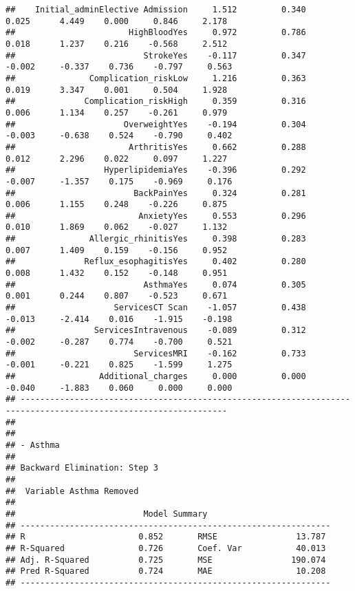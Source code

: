 \documentclass[
]{article}
\begin{document}
\begin{verbatim}
##    Initial_adminElective Admission     1.512         0.340        0.025      4.449    0.000     0.846     2.178 
##                       HighBloodYes     0.972         0.786        0.018      1.237    0.216    -0.568     2.512 
##                          StrokeYes    -0.117         0.347       -0.002     -0.337    0.736    -0.797     0.563 
##               Complication_riskLow     1.216         0.363        0.019      3.347    0.001     0.504     1.928 
##              Complication_riskHigh     0.359         0.316        0.006      1.134    0.257    -0.261     0.979 
##                      OverweightYes    -0.194         0.304       -0.003     -0.638    0.524    -0.790     0.402 
##                       ArthritisYes     0.662         0.288        0.012      2.296    0.022     0.097     1.227 
##                  HyperlipidemiaYes    -0.396         0.292       -0.007     -1.357    0.175    -0.969     0.176 
##                        BackPainYes     0.324         0.281        0.006      1.155    0.248    -0.226     0.875 
##                         AnxietyYes     0.553         0.296        0.010      1.869    0.062    -0.027     1.132 
##               Allergic_rhinitisYes     0.398         0.283        0.007      1.409    0.159    -0.156     0.952 
##              Reflux_esophagitisYes     0.402         0.280        0.008      1.432    0.152    -0.148     0.951 
##                          AsthmaYes     0.074         0.305        0.001      0.244    0.807    -0.523     0.671 
##                    ServicesCT Scan    -1.057         0.438       -0.013     -2.414    0.016    -1.915    -0.198 
##                ServicesIntravenous    -0.089         0.312       -0.002     -0.287    0.774    -0.700     0.521 
##                        ServicesMRI    -0.162         0.733       -0.001     -0.221    0.825    -1.599     1.275 
##                 Additional_charges     0.000         0.000       -0.040     -1.883    0.060     0.000     0.000 
## ----------------------------------------------------------------------------------------------------------------
## 
## 
## - Asthma 
## 
## Backward Elimination: Step 3 
## 
##  Variable Asthma Removed 
## 
##                          Model Summary                          
## ---------------------------------------------------------------
## R                       0.852       RMSE                13.787 
## R-Squared               0.726       Coef. Var           40.013 
## Adj. R-Squared          0.725       MSE                190.074 
## Pred R-Squared          0.724       MAE                 10.208 
## ---------------------------------------------------------------

\end{verbatim}
\end{document}
